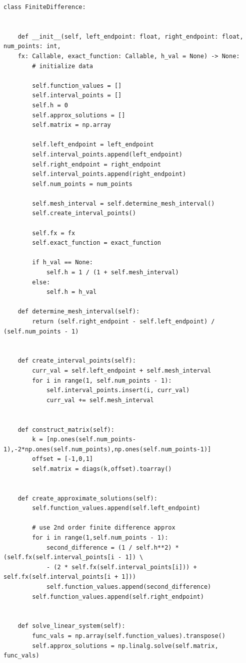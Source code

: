 \documentclass[10pt]{article}
\newcommand{\1}{\mathbb{1}}
\begin{document}
\begin{verbatim}
class FiniteDifference:


    def __init__(self, left_endpoint: float, right_endpoint: float, num_points: int, 
    fx: Callable, exact_function: Callable, h_val = None) -> None:
        # initialize data

        self.function_values = []
        self.interval_points = []
        self.h = 0
        self.approx_solutions = []
        self.matrix = np.array 

        self.left_endpoint = left_endpoint
        self.interval_points.append(left_endpoint)
        self.right_endpoint = right_endpoint
        self.interval_points.append(right_endpoint)
        self.num_points = num_points 

        self.mesh_interval = self.determine_mesh_interval()
        self.create_interval_points()
        
        self.fx = fx 
        self.exact_function = exact_function

        if h_val == None:
            self.h = 1 / (1 + self.mesh_interval)
        else:
            self.h = h_val

    def determine_mesh_interval(self):
        return (self.right_endpoint - self.left_endpoint) / (self.num_points - 1)


    def create_interval_points(self):
        curr_val = self.left_endpoint + self.mesh_interval
        for i in range(1, self.num_points - 1):
            self.interval_points.insert(i, curr_val)
            curr_val += self.mesh_interval
   

    def construct_matrix(self):
        k = [np.ones(self.num_points-1),-2*np.ones(self.num_points),np.ones(self.num_points-1)]
        offset = [-1,0,1]
        self.matrix = diags(k,offset).toarray()


    def create_approximate_solutions(self):
        self.function_values.append(self.left_endpoint)

        # use 2nd order finite difference approx 
        for i in range(1,self.num_points - 1):
            second_difference = (1 / self.h**2) * (self.fx(self.interval_points[i - 1]) \
            - (2 * self.fx(self.interval_points[i])) + self.fx(self.interval_points[i + 1]))
            self.function_values.append(second_difference)
        self.function_values.append(self.right_endpoint)


    def solve_linear_system(self):
        func_vals = np.array(self.function_values).transpose()
        self.approx_solutions = np.linalg.solve(self.matrix, func_vals)



\end{verbatim}
\end{document}
